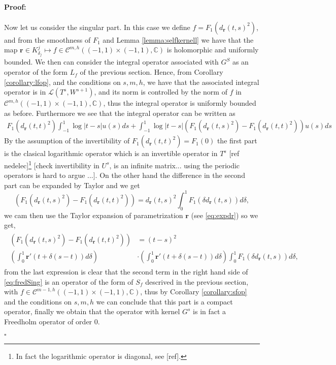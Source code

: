 \documentclass{article}
\newenvironment{proof}{\paragraph{Proof:}}{\hfill$\square$}
\newcommand{\todo}[1]{{\color{red}[#1]}}
\newcommand{\IC}{{\mathbb C}}
\newcommand{\cmspaceh}[4]{\mathcal{C}^{#1,#2} \left( #3, #4 \right)}
\newcommand{\br}{\bm{r}}
\newcommand{\iinterv}{(-1,1)\times(-1,1)}
\begin{document}
\begin{proof}
Now let us consider the singular part. In this case we define $f =F_1(d_{\br}(t,s)^2)$, and from the smoothness of $F_1$ and Lemma \ref{lemma:selfkernell} we have that the map $\br \in K^j_{\delta_j} \mapsto f \in \cmspaceh{m}{h}{\iinterv}{\IC}$ is holomorphic and uniformly bounded. We then can consider the integral operator associated with $G^S$ as an operator of the form $L_f$ of the previous section. Hence, from Corollary \ref{corollary:lfop}, and the conditions on $s,m,h$, we have that the associated integral operator is in $\mathcal{L}(T^s,W^{s+1})$, and its norm is controlled by the norm of $f$ in $\cmspaceh{m}{h}{\iinterv}{\IC}$, thus the integral operator is uniformly bounded as before. Furthermore we see that the integral operator can be written as
\begin{align}
\label{eq:fredSing}
F_1(d_{\br}(t,t)^2)\int_{-1}^1 \log|t-s| u(s) ds + \int_{-1}^1 \log|t-s| (F_1(d_{\br}(t,s)^2)-F_1(d_{\br}(t,t)^2))u(s) ds
\end{align}
By the assumption of the invertibility of $F_1(d_{\br}(t,t)^2)= F_1(0)$  the first part is the clasical logarithmic operator which is an invertible operator in $T^s$ \todo{ref nedelec}\footnote{In fact the logarithmic operator is diagonal, see \todo{ref}.} \todo{check invertibility in $U^s$, is an infinite matrix... using the periodic operators is hard to argue ...}. On the other hand the difference in the second part can be expanded by Taylor and we get 
$$
(F_1(d_{\br}(t,s)^2)-F_1(d_{\br}(t,t)^2)) = d_{\br}(t,s)^2\int_{0}^1 F_1(\delta d_{\br}(t,s))d\delta,
$$
we cam then use the Taylor expansion of parametrization $\br$ (see \eqref{eq:expdr}) so we get,
\begin{align*}
\begin{split}
(F_1(d_{\br}(t,s)^2)-F_1(d_{\br}(t,t)^2)) &= (t-s)^2 \\ \left(\int_{0}^1 \br'(t+\delta(s-t))d\delta \right) &\cdot \left(\int_{0}^1 \br'(t+\delta(s-t))d\delta \right)\int_{0}^1 F_1(\delta d_{\br}(t,s))d\delta,
\end{split}
\end{align*}
from the last expression is clear that the second term in the right hand side of \eqref{eq:fredSing} is an operator of the form of $S_f$ descrived in the previous section, with $f \in \cmspaceh{m-1}{h}{\iinterv}{\IC}$, thus by Corollary \ref{corollary:sfop} and the conditions on $s,m,h$ we can conclude that this part is a compact operator, finally we obtain that the operator with kernel $G^s$ is in fact a Freedholm operator of order $0$.


\end{proof}
\end{document}
